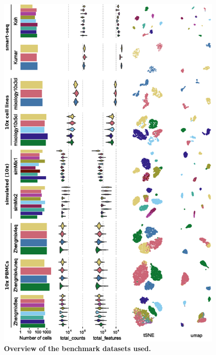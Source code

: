 \documentclass{bmcart}
\begin{document}
\begin{figure}
    \centering
    \includegraphics[width=\textwidth,keepaspectratio]{dataset_description}
    \caption{\textbf{Overview of the benchmark datasets used.}}
    \label{fig:figure1}
\end{figure}
\end{document}
